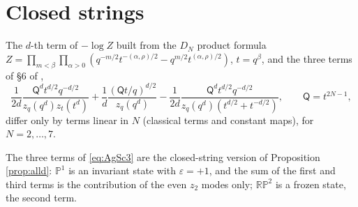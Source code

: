 \section{Closed strings}\label{app:closed}
\begin{result}\label{cr:closed}
The $d$-th term of $-\log Z$ built from the $D_N$ product formula $Z = \prod_{m<\beta}\prod_{\alpha>0}(q^{-m/2}t^{-(\alpha,\rho)/2} - q^{m/2}t^{(\alpha,\rho)/2})$, $t = q^\beta$, and the three terms of \S6 of \cite{AgSc12},
\begin{equation}\label{eq:AgSc3}
\frac{1}{2d}\frac{\mathsf{Q}^d t^{d/2} q^{-d/2}}{z_q(q^d) z_t(t^d)} + \frac1d \frac{(\mathsf{Q} t/q)^{d/2}}{z_q(q^d)} - \frac{1}{2d}\frac{\mathsf{Q}^d t^{d/2}q^{-d/2}}{z_q(q^d)(t^{d/2} + t^{-d/2})},\qquad \mathsf{Q} = t^{2N-1},
\end{equation}
differ only by terms linear in $N$ (classical terms and constant maps), for $N = 2, \dots, 7$.
\end{result}
The three terms of \eqref{eq:AgSc3} are the closed-string version of Proposition \ref{prop:alld}: $\mathbb{P}^1$ is an invariant state with $\varepsilon = +1$, and the sum of the first and third terms is the contribution of the even $z_2$ modes only; $\mathbb{RP}^2$ is a frozen state, the second term.


